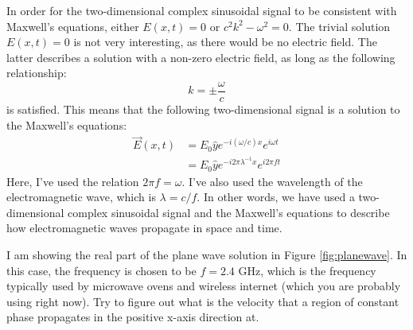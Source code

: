 In order for the two-dimensional complex sinusoidal signal to be consistent with Maxwell's equations,
either $E(x,t)=0$ or $c^2k^2-\omega^2 = 0$.
The trivial solution $E(x,t)=0$ is not very interesting, as there would be no electric field.
The latter describes a solution with a non-zero electric field, as long as the following relationship:
\begin{equation}
  k = \pm \frac{\omega}{c}
\end{equation}
is satisfied. This means that the following two-dimensional signal is a solution to the Maxwell's equations:
\begin{align}
  \vec{E}(x,t) & = E_0 \hat{y} e^{-i (\omega/c) x} e^{i\omega t}         \\
               & = E_0 \hat{y} e^{-i 2\pi \lambda^{-1} x} e^{i 2\pi f t}
\end{align}
Here, I've used the relation $2\pi f = \omega$. I've also used the wavelength of the
electromagnetic wave, which is $\lambda = c/f$. In other words, we have used a two-dimensional
complex sinusoidal signal and the Maxwell's equations to describe how electromagnetic waves
propagate in space and time.

I am showing the real part of the plane wave solution in
Figure \ref{fig:planewave}. In this case, the frequency is chosen to
be $f=2.4$ GHz, which is the frequency typically used by microwave
ovens and wireless internet (which you are probably using right
now). Try to figure out what is the velocity that a region of constant
phase propagates in the positive x-axis direction at.



